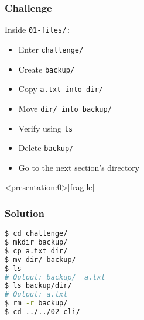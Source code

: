 \begin{frame}
\frametitle{Challenge}
Inside \tt{01-files/}:
\begin{itemize}
    \item Enter \tt{challenge/}
    \item Create \tt{backup/}
    \item Copy \tt{a.txt} into \tt{dir/}
    \item Move \tt{dir/} into \tt{backup/}
    \item Verify using \tt{ls}
    \item Delete \tt{backup/}
    \item Go to the next section's directory
\end{itemize}
\end{frame}

\begin{frame}<presentation:0>[fragile]
\frametitle{Solution}
\begin{lstlisting}[language=bash]
$ cd challenge/
$ mkdir backup/
$ cp a.txt dir/
$ mv dir/ backup/
$ ls
# Output: backup/  a.txt
$ ls backup/dir/
# Output: a.txt
$ rm -r backup/
$ cd ../../02-cli/
\end{lstlisting}
\end{frame}
